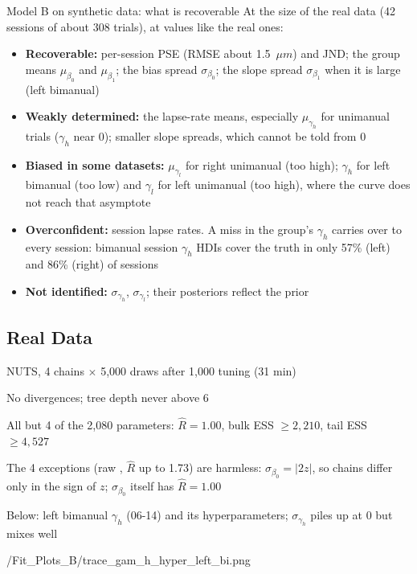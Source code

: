 \begin{frame}{Model B on synthetic data: what is recoverable}
  At the size of the real data (42 sessions of about 308 trials), at values like the real ones:
  \begin{itemize}
    \item \textbf{Recoverable:} per-session PSE (RMSE about 1.5~$\mu m$) and JND; the group means
          $\mu_{\beta_0}$ and $\mu_{\beta_1}$; the bias spread $\sigma_{\beta_0}$; the slope spread
          $\sigma_{\beta_1}$ when it is large (left bimanual)
    \item \textbf{Weakly determined:} the lapse-rate means, especially $\mu_{\gamma_h}$ for unimanual
          trials ($\gamma_h$ near 0); smaller slope spreads, which cannot be told from 0
    \item \textbf{Biased in some datasets:} $\mu_{\gamma_l}$ for right unimanual (too high); $\gamma_h$
          for left bimanual (too low) and $\gamma_l$ for left unimanual (too high), where the curve
          does not reach that asymptote
    \item \textbf{Overconfident:} session lapse rates. A miss in the group's $\gamma_h$ carries over
          to every session: bimanual session $\gamma_h$ HDIs cover the truth in only 57\% (left)
          and 86\% (right) of sessions
    \item \textbf{Not identified:} $\sigma_{\gamma_h}$, $\sigma_{\gamma_l}$; their posteriors reflect the prior
  \end{itemize}
\end{frame}

\subsection{Real Data}

  {\item NUTS, 4 chains $\times$ 5{,}000 draws after 1{,}000 tuning (31 min)
   \item No divergences; tree depth never above 6
   \item All but 4 of the 2{,}080 parameters: $\hat{R} = 1.00$, bulk ESS $\ge 2{,}210$, tail ESS $\ge 4{,}527$
   \item The 4 exceptions (raw , $\hat{R}$ up to 1.73) are harmless: $\sigma_{\beta_0} = |2z|$, so
         chains differ only in the sign of $z$; $\sigma_{\beta_0}$ itself has $\hat{R} = 1.00$
   \item Below: left bimanual $\gamma_h$ (06-14) and its hyperparameters; $\sigma_{\gamma_h}$ piles up at 0 but mixes well}
  {\plotsB/Fit_Plots_B/trace_gam_h_hyper_left_bi.png}

